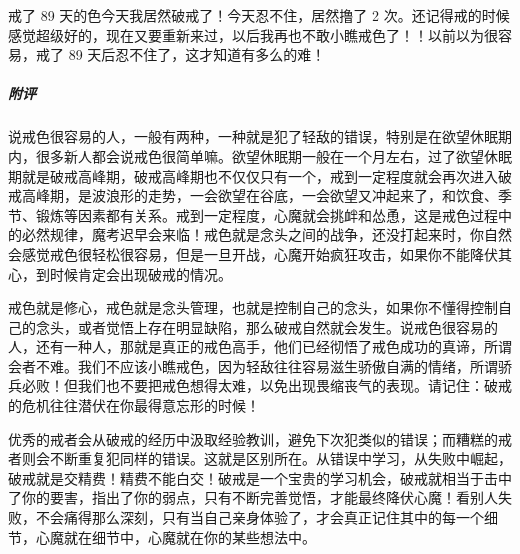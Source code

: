 \begin{case}
    戒了 89 天的色今天我居然破戒了！今天忍不住，居然撸了 2 次。还记得戒的时候感觉超级好的，现在又要重新来过，以后我再也不敢小瞧戒色了！！以前以为很容易，戒了 89 天后忍不住了，这才知道有多么的难！
    \subparagraph{附评} 说戒色很容易的人，一般有两种，一种就是犯了轻敌的错误，特别是在欲望休眠期内，很多新人都会说戒色很简单嘛。欲望休眠期一般在一个月左右，过了欲望休眠期就是破戒高峰期，破戒高峰期也不仅仅只有一个，戒到一定程度就会再次进入破戒高峰期，是波浪形的走势，一会欲望在谷底，一会欲望又冲起来了，和饮食、季节、锻炼等因素都有关系。戒到一定程度，心魔就会挑衅和怂恿，这是戒色过程中的必然规律，魔考迟早会来临！戒色就是念头之间的战争，还没打起来时，你自然会感觉戒色很轻松很容易，但是一旦开战，心魔开始疯狂攻击，如果你不能降伏其心，到时候肯定会出现破戒的情况。

    戒色就是修心，戒色就是念头管理，也就是控制自己的念头，如果你不懂得控制自己的念头，或者觉悟上存在明显缺陷，那么破戒自然就会发生。说戒色很容易的人，还有一种人，那就是真正的戒色高手，他们已经彻悟了戒色成功的真谛，所谓会者不难。我们不应该小瞧戒色，因为轻敌往往容易滋生骄傲自满的情绪，所谓骄兵必败！但我们也不要把戒色想得太难，以免出现畏缩丧气的表现。请记住：破戒的危机往往潜伏在你最得意忘形的时候！

    优秀的戒者会从破戒的经历中汲取经验教训，避免下次犯类似的错误；而糟糕的戒者则会不断重复犯同样的错误。这就是区别所在。从错误中学习，从失败中崛起，破戒就是交精费！精费不能白交！破戒是一个宝贵的学习机会，破戒就相当于击中了你的要害，指出了你的弱点，只有不断完善觉悟，才能最终降伏心魔！看别人失败，不会痛得那么深刻，只有当自己亲身体验了，才会真正记住其中的每一个细节，心魔就在细节中，心魔就在你的某些想法中。
\end{case}

